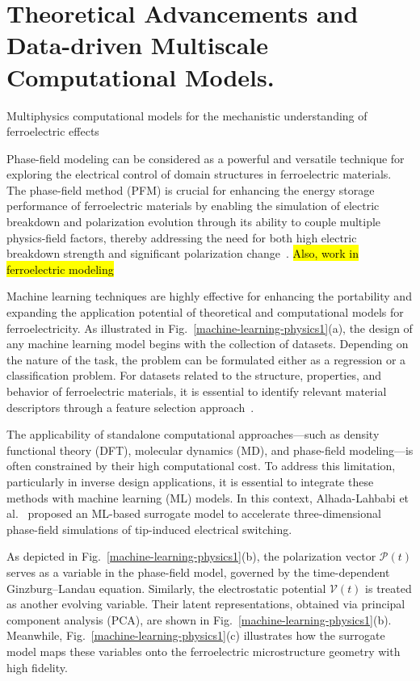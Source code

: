 \documentclass[a4paper,fleqn]{cas-sc}
\begin{document}
\section{Theoretical Advancements and Data-driven Multiscale Computational Models.} \label{multiphysics-computational-models}
Multiphysics computational models for the mechanistic understanding of ferroelectric effects

\par Phase-field modeling can be considered as a powerful and versatile technique for exploring the electrical control of domain structures in ferroelectric materials. The phase-field method (PFM) is crucial for enhancing the energy storage performance of ferroelectric materials by enabling the simulation of electric breakdown and polarization evolution through its ability to couple multiple physics-field factors, thereby addressing the need for both high electric breakdown strength and significant polarization change~\cite{Xu2025-JMI}. \hl{Also, work in ferroelectric modeling} \cite{BRITSON2016285}

\par Machine learning techniques are highly effective for enhancing the portability and expanding the application potential of theoretical and computational models for ferroelectricity. As illustrated in Fig.~\ref{machine-learning-physics1}(a), the design of any machine learning model begins with the collection of datasets. Depending on the nature of the task, the problem can be formulated either as a regression or a classification problem. For datasets related to the structure, properties, and behavior of ferroelectric materials, it is essential to identify relevant material descriptors through a feature selection approach~\cite{HE2021116815}.
\par The applicability of standalone computational approaches—such as density functional theory (DFT), molecular dynamics (MD), and phase-field modeling—is often constrained by their high computational cost. To address this limitation, particularly in inverse design applications, it is essential to integrate these methods with machine learning (ML) models. In this context, Alhada-Lahbabi et al.~\cite{Alhada-Lahbabi2024} proposed an ML-based surrogate model to accelerate three-dimensional phase-field simulations of tip-induced electrical switching.


As depicted in Fig.~\ref{machine-learning-physics1}(b), the polarization vector \(\mathscr{P}(t)\) serves as a variable in the phase-field model, governed by the time-dependent Ginzburg–Landau equation. Similarly, the electrostatic potential \(\mathscr{V}(t)\) is treated as another evolving variable. Their latent representations, obtained via principal component analysis (PCA), are shown in Fig.~\ref{machine-learning-physics1}(b). Meanwhile, Fig.~\ref{machine-learning-physics1}(c) illustrates how the surrogate model maps these variables onto the ferroelectric microstructure geometry with high fidelity.
\end{document}
